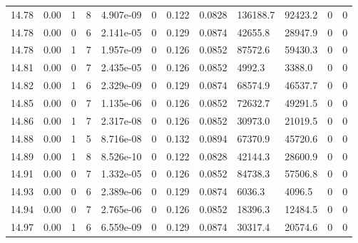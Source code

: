 \documentclass[preview]{standalone}
\begin{document}
{{{{{{{{{{{{{{{{{{\begin{tabular}{L{1.2cm}C{1.2cm} C{0.3cm}C{0.5cm} C{1.4cm}C{1.4cm} C{1.4cm}C{1.4cm} C{1.6cm}C{1.6cm} C{1.6cm}C{1.6cm}}
  14.78  &  0.00  & 1     &  8 &  4.907e-09  & 0  &  0.122&   0.0828& 136188.7 & 92423.2   &  0 & 0  \\ 
  14.78  &  0.00  & 0     &  6 &  2.141e-05  & 0  &  0.129&   0.0874& 42655.8 & 28947.9   &  0 & 0  \\ 
  14.78  &  0.00  & 1     &  7 &  1.957e-09  & 0  &  0.126&   0.0852& 87572.6 & 59430.3   &  0 & 0  \\ 
  14.81  &  0.00  & 0     &  7 &  2.435e-05  & 0  &  0.126&   0.0852& 4992.3 & 3388.0   &  0 & 0  \\ 
  14.82  &  0.00  & 1     &  6 &  2.329e-09  & 0  &  0.129&   0.0874& 68574.9 & 46537.7   &  0 & 0  \\ 
  14.85  &  0.00  & 0     &  7 &  1.135e-06  & 0  &  0.126&   0.0852& 72632.7 & 49291.5   &  0 & 0  \\ 
  14.86  &  0.00  & 1     &  7 &  2.317e-08  & 0  &  0.126&   0.0852& 30973.0 & 21019.5   &  0 & 0  \\ 
  14.88  &  0.00  & 1     &  5 &  8.716e-08  & 0  &  0.132&   0.0894& 67370.9 & 45720.6   &  0 & 0  \\ 
  14.89  &  0.00  & 1     &  8 &  8.526e-10  & 0  &  0.122&   0.0828& 42144.3 & 28600.9   &  0 & 0  \\ 
  14.91  &  0.00  & 0     &  7 &  1.332e-05  & 0  &  0.126&   0.0852& 84738.3 & 57506.8   &  0 & 0  \\ 
  14.93  &  0.00  & 0     &  6 &  2.389e-06  & 0  &  0.129&   0.0874& 6036.3 & 4096.5   &  0 & 0  \\ 
  14.94  &  0.00  & 0     &  7 &  2.765e-06  & 0  &  0.126&   0.0852& 18396.3 & 12484.5   &  0 & 0  \\ 
  14.97  &  0.00  & 1     &  6 &  6.559e-09  & 0  &  0.129&   0.0874& 30317.4 & 20574.6   &  0 & 0  \\ 
\hline 
\end{tabular} 

}}}}}}}}}}}}}}}}}}
\end{document}
